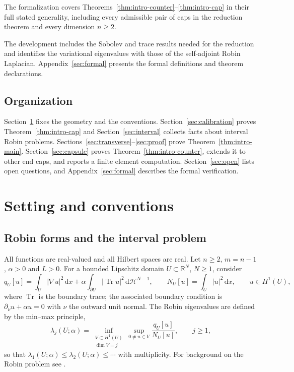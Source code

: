 \documentclass[11pt,a4paper]{article}
\numberwithin{equation}{section}
\theoremstyle{paperplain}
\theoremstyle{remark}
\newcommand{\R}{\mathbb{R}}
\newcommand{\HH}{\mathcal{H}}
\newcommand{\dd}{\,\mathrm d}
\newcommand{\Tr}{\operatorname{Tr}}
\begin{document}
The formalization covers Theorems~\ref{thm:intro-counter}--\ref{thm:intro-cap}
in their full stated generality, including every admissible pair of caps in
the reduction theorem and every dimension $n\ge2$.

The development includes the Sobolev and trace results needed for the
reduction and identifies the variational eigenvalues with those of the
self-adjoint Robin Laplacian. Appendix~\ref{sec:formal} presents the formal
definitions and theorem declarations.

\subsection{Organization}
Section~\ref{sec:setup} fixes the geometry and the conventions.
Section~\ref{sec:calibration} proves Theorem~\ref{thm:intro-cap} and
Section~\ref{sec:interval} collects facts about interval Robin problems.
Sections~\ref{sec:transverse}--\ref{sec:proof} prove
Theorem~\ref{thm:intro-main}. Section~\ref{sec:capsule} proves
Theorem~\ref{thm:intro-counter}, extends it to other end caps, and reports
a finite element computation. Section~\ref{sec:open} lists open questions,
and Appendix~\ref{sec:formal} describes the formal verification.

\section{Setting and conventions}\label{sec:setup}

\subsection{Robin forms and the interval problem}
All functions are real-valued and all Hilbert spaces are real. Let
$n\ge2$, $m=n-1$, $\alpha>0$ and $L>0$. For a bounded Lipschitz domain
$U\subset\R^N$, $N\ge1$, consider
\[
 q_U[u]=\int_U|\nabla u|^2\dd x+\alpha\int_{\partial U}|\Tr u|^2\dd\HH^{N-1},
 \qquad N_U[u]=\int_U|u|^2\dd x,\qquad u\in H^1(U),
\]
where $\Tr$ is the boundary trace; the associated boundary condition is
$\partial_\nu u+\alpha u=0$ with $\nu$ the outward unit normal. The Robin
eigenvalues are defined by the min--max principle,
\begin{equation}\label{eq:minmax}
 \lambda_j(U;\alpha)=
 \inf_{\substack{V\subset H^1(U)\\ \dim V=j}}
 \sup_{0\ne u\in V}\frac{q_U[u]}{N_U[u]},\qquad j\ge1,
\end{equation}
so that $\lambda_1(U;\alpha)\le\lambda_2(U;\alpha)\le\cdots$ with
multiplicity. For background on the Robin problem see \cite{BFK,Laugesen}.
\end{document}
